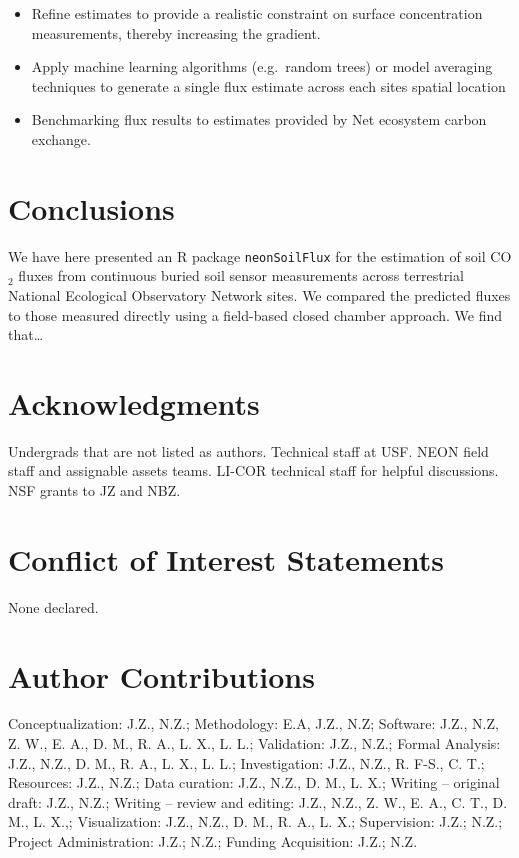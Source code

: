 \documentclass[
  letterpaper,
  DIV=11,
  numbers=noendperiod]{scrartcl}
\providecommand{\tightlist}{%
  \setlength{\itemsep}{0pt}\setlength{\parskip}{0pt}}\usepackage{longtable,booktabs,array}
\begin{document}
\begin{itemize}
\tightlist
\item
  Refine estimates to provide a realistic constraint on surface
  concentration measurements, thereby increasing the gradient.
\item
  Apply machine learning algorithms (e.g.~random trees) or model
  averaging techniques to generate a single flux estimate across each
  sites spatial location
\item
  Benchmarking flux results to estimates provided by Net ecosystem
  carbon exchange.
\end{itemize}

\section{Conclusions}\label{conclusions}

We have here presented an R package \texttt{neonSoilFlux} for the
estimation of soil CO\(_{2}\) fluxes from continuous buried soil sensor
measurements across terrestrial National Ecological Observatory Network
sites. We compared the predicted fluxes to those measured directly using
a field-based closed chamber approach. We find that\ldots{}

\section{Acknowledgments}\label{acknowledgments}

Undergrads that are not listed as authors. Technical staff at USF. NEON
field staff and assignable assets teams. LI-COR technical staff for
helpful discussions. NSF grants to JZ and NBZ.

\section{Conflict of Interest
Statements}\label{conflict-of-interest-statements}

None declared.

\section{Author Contributions}\label{author-contributions}

Conceptualization: J.Z., N.Z.; Methodology: E.A, J.Z., N.Z; Software:
J.Z., N.Z, Z. W., E. A., D. M., R. A., L. X., L. L.; Validation: J.Z.,
N.Z.; Formal Analysis: J.Z., N.Z., D. M., R. A., L. X., L. L.;
Investigation: J.Z., N.Z., R. F-S., C. T.; Resources: J.Z., N.Z.; Data
curation: J.Z., N.Z., D. M., L. X.; Writing -- original draft: J.Z.,
N.Z.; Writing -- review and editing: J.Z., N.Z., Z. W., E. A., C. T., D.
M., L. X.,; Visualization: J.Z., N.Z., D. M., R. A., L. X.; Supervision:
J.Z.; N.Z.; Project Administration: J.Z.; N.Z.; Funding Acquisition:
J.Z.; N.Z.
\end{document}

